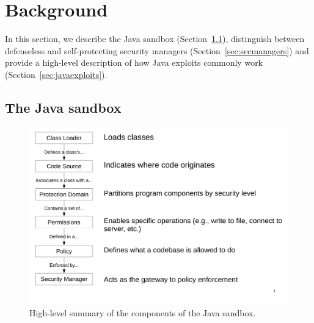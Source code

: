 \documentclass{sig-alternate}
\begin{document}

\section{Background}\label{sec:Background}

In this section, we describe the Java sandbox
(Section~\ref{sec:sandbox}), distinguish between defenseless and self-protecting
security managers (Section~\ref{sec:secmanagers}) and provide a high-level
description of how Java exploits commonly work
(Section~\ref{sec:javaexploits}). 

\subsection{The Java sandbox}
\label{sec:sandbox}

\begin{figure}
\includegraphics[width=\columnwidth]{sandbox_overview}
\caption{High-level summary of the components of the Java 
\label{fig:Sandbox-high-level-summary}
sandbox.}
\end{figure}
\end{document}

